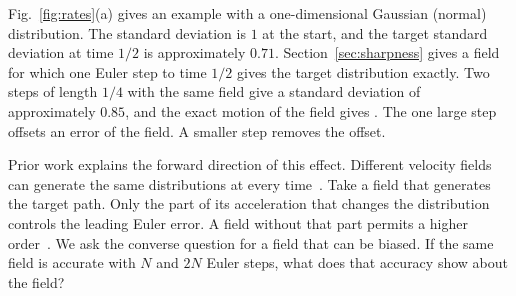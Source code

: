 Fig.~\ref{fig:rates}(a) gives an example with a one-dimensional Gaussian
(normal) distribution. The standard deviation is $1$ at the start, and
the target standard deviation at time $1/2$ is approximately $0.71$.
Section~\ref{sec:sharpness} gives a field for which one Euler step to
time $1/2$ gives the target distribution exactly. Two steps of length
$1/4$ with the same field give a standard deviation of approximately
$0.85$, and the exact motion of the field gives \IntroExactFlow{}. The
one large step offsets an error of the field. A smaller step removes the
offset.

Prior work explains the forward direction of this effect. Different
velocity fields can generate the same distributions at every
time~\citep{horvat2024gauge}. Take a field that generates the target
path. Only the part of its acceleration that changes the distribution
controls the leading Euler error. A field without that part permits a
higher order~\citep{obzherin2026density,obzherin2026finite}. We ask the converse question for a field that can be biased. If the
same field is accurate with $N$ and $2N$ Euler steps, what does that
accuracy show about the field?


